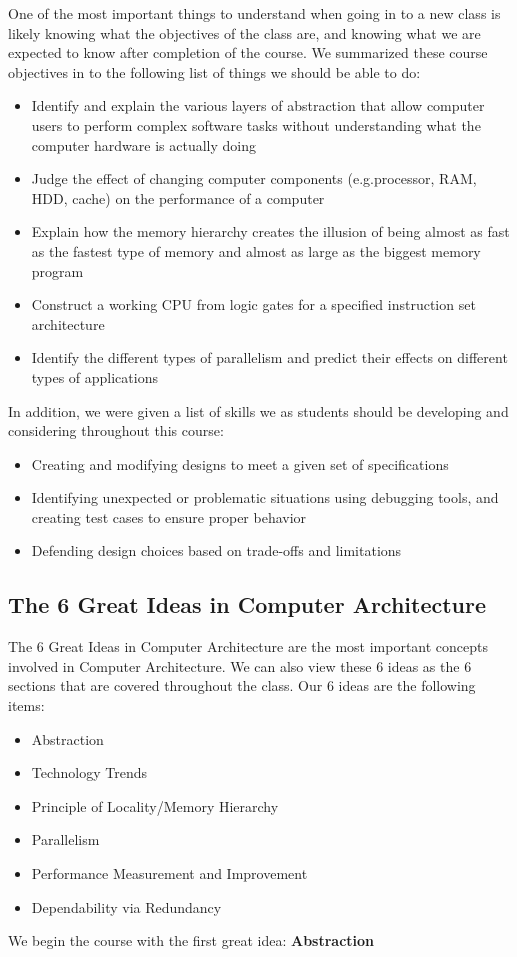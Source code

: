 \documentclass[letterpaper]{article}
\theoremstyle{remark}
\begin{document}
One of the most important things to understand when going in to a new class is likely knowing what the objectives of the class are, and knowing what we are expected to know after completion of the course. We summarized these course objectives in to the following list of things we should be able to do:
\begin{itemize}
    \item Identify and explain the various layers of abstraction that allow computer users to perform complex software tasks without understanding what the computer hardware is actually doing
    \item Judge the effect of changing computer components (e.g.processor, RAM, HDD, cache) on the performance of a computer
    \item Explain how the memory hierarchy creates the illusion of being almost as fast as the fastest type of memory and almost as large as the biggest memory program
    \item Construct a working CPU from logic gates for a specified instruction set architecture
    \item Identify the different types of parallelism and predict their effects on different types of applications
\end{itemize}
In addition, we were given a list of skills we as students should be developing and considering throughout this course:
\begin{itemize}
    \item Creating and modifying designs to meet a given set of specifications
    \item Identifying unexpected or problematic situations using debugging tools, and creating test cases to ensure proper behavior
    \item Defending design choices based on trade-offs and limitations
\end{itemize}

\subsection{The 6 Great Ideas in Computer Architecture}

The 6 Great Ideas in Computer Architecture are the most important concepts involved in Computer Architecture. We can also view these 6 ideas as the 6 sections that are covered throughout the class. Our 6 ideas are the following items:
\begin{itemize}
    \item Abstraction
    \item Technology Trends
    \item Principle of Locality/Memory Hierarchy
    \item Parallelism
    \item Performance Measurement and Improvement
    \item Dependability via Redundancy
\end{itemize}
We begin the course with the first great idea: \textbf{Abstraction}
\end{document}
